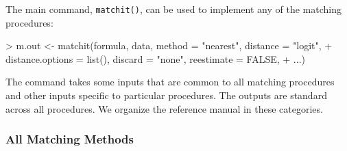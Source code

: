 
The main command, \texttt{matchit()}, can be used to implement any of
the matching procedures:
\begin{Schunk}
\begin{Sinput}
> m.out <- matchit(formula, data, method = "nearest", distance = "logit", 
+     distance.options = list(), discard = "none", reestimate = FALSE, 
+     ...)
\end{Sinput}
\end{Schunk}
The command takes some inputs that are common to all matching
procedures and other inputs specific to particular procedures.  The
outputs are standard across all procedures.  We organize the reference
manual in these categories.

\subsubsection{All Matching Methods}
\label{subsubsec:inputs-all}

